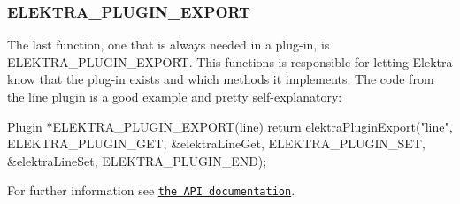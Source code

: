 \subsubsection*{E\+L\+E\+K\+T\+R\+A\+\_\+\+P\+L\+U\+G\+I\+N\+\_\+\+E\+X\+P\+O\+R\+T}

The last function, one that is always needed in a plug-\/in, is {\ttfamily E\+L\+E\+K\+T\+R\+A\+\_\+\+P\+L\+U\+G\+I\+N\+\_\+\+E\+X\+P\+O\+R\+T}. This functions is responsible for letting Elektra know that the plug-\/in exists and which methods it implements. The code from the line plugin is a good example and pretty self-\/explanatory\+: \begin{DoxyVerb}    Plugin *ELEKTRA_PLUGIN_EXPORT(line)
    {
            return elektraPluginExport("line",
            ELEKTRA_PLUGIN_GET, &elektraLineGet,
            ELEKTRA_PLUGIN_SET, &elektraLineSet,
            ELEKTRA_PLUGIN_END);
    }
\end{DoxyVerb}


For further information see \href{http://doc.libelektra.org/api/current/html/group__plugin.html}{\tt the A\+P\+I documentation}. 